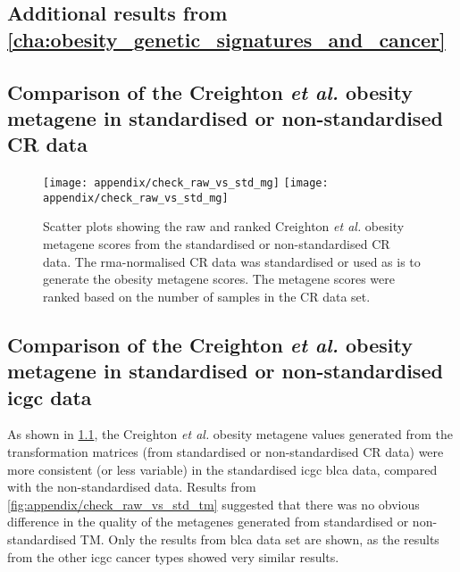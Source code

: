 \begin{appendices}
	\renewcommand{\thesection}{\Alph{chapter}\arabic{section}}
	\renewcommand{\thetable}{S\arabic{table}}
	\renewcommand{\thefigure}{S\arabic{figure}}
	\setcounter{figure}{0}
	\setcounter{table}{0}

	\chapter{Additional results from \cref{cha:obesity_genetic_signatures_and_cancer}}
	\label{app:a}

	\section{Comparison of the Creighton \textit{et al.} obesity metagene in standardised or non-standardised CR data}
	\label{sec:metagenes_created_from_raw_data_vs_standardised_data}

	\begin{figure}[htpb]
		\centering
		\texttt{[image: appendix/check\_raw\_vs\_std\_mg]}
		\hfill
		\texttt{[image: appendix/check\_raw\_vs\_std\_mg]}
		\caption[Comparison of the raw and ranked Creighton \textit{et al.} obesity metagene scores from the standardised or non-standardised CR data]{Scatter plots showing the raw and ranked Creighton \textit{et al.} obesity metagene scores from the standardised or non-standardised CR data.
		The \gls{rma}-normalised CR data was standardised or used as is to generate the obesity metagene scores.
		The metagene scores were ranked based on the number of samples in the CR data set.
		}
		\label{fig:appendix/check_raw_vs_std}
	\end{figure}

	\section{Comparison of the Creighton \textit{et al.} obesity metagene in standardised or non-standardised \gls{icgc} data}
	\label{sec:comp_cr_raw_std_icgc}

	As shown in \cref{fig:appendix/check_raw_vs_std}, the Creighton \textit{et al.} obesity metagene values generated from the transformation matrices (from standardised or non-standardised CR data) were more consistent (or less variable) in the standardised \gls{icgc} \gls{blca} data, compared with the non-standardised data.
	Results from \cref{fig:appendix/check_raw_vs_std_tm} suggested that there was no obvious difference in the quality of the metagenes generated from standardised or non-standardised TM.
	Only the results from \gls{blca} data set are shown, as the results from the other \gls{icgc} cancer types showed very similar results.


\end{appendices}
